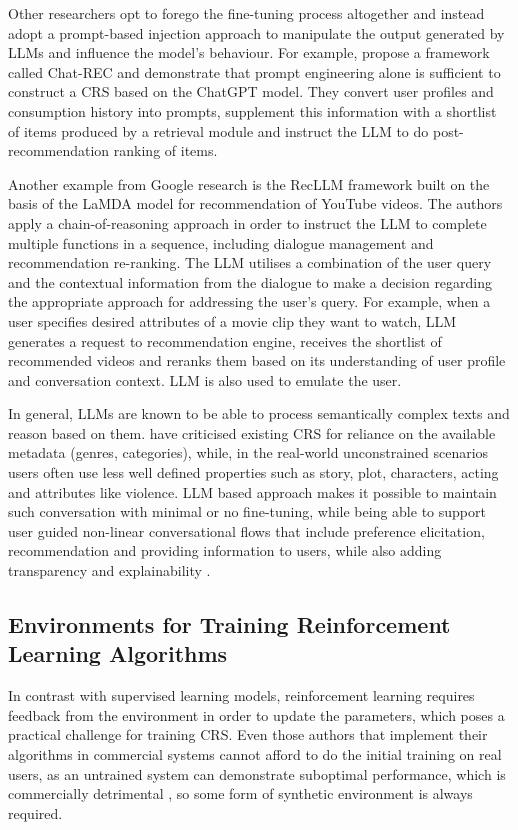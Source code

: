 Other researchers opt to forego the fine-tuning process altogether and instead adopt a prompt-based injection approach to manipulate the output generated by LLMs and influence the model's behaviour. For example, \citep{gao2023chat} propose a framework called Chat-REC and demonstrate that prompt engineering alone is sufficient to construct a CRS based on the ChatGPT model. They convert user profiles and consumption history into prompts, supplement this information with a shortlist of items produced by a retrieval module and instruct the LLM to do post-recommendation ranking of items. 

Another example from Google research is the RecLLM framework built on the basis of the LaMDA model \citep{friedman2023leveraging} for recommendation of YouTube videos.  The authors apply a chain-of-reasoning approach in order to instruct the LLM to complete multiple functions in a sequence, including dialogue management and recommendation re-ranking. The LLM utilises a combination of the user query and the contextual information from the dialogue to make a decision regarding the appropriate approach for addressing the user's query. For example, when a user specifies desired attributes of a movie clip they want to watch, LLM generates a request to recommendation engine, receives the shortlist of recommended videos and reranks them based on its understanding of user profile and conversation context. LLM is also used to emulate the user.

In general, LLMs are known to be able to process semantically complex texts and reason based on them. \cite{radlinski2019coached} have criticised existing CRS for reliance on the available metadata (genres, categories), while, in the real-world unconstrained scenarios users often use less well defined properties such as story, plot, characters, acting and attributes like violence. LLM based approach makes it possible to maintain such conversation with minimal or no fine-tuning, while being able to support user guided non-linear conversational flows that include preference elicitation, recommendation and providing information to users, while also adding transparency and explainability \citep{gao2023chat, bao2023tallrec}.

\subsection{Environments for Training Reinforcement Learning Algorithms}
In contrast with supervised learning models, reinforcement learning requires feedback from the environment in order to update the parameters, which poses a practical challenge for training CRS. Even those authors that implement their algorithms in commercial systems cannot afford to do the initial training on real users, as an untrained system can demonstrate suboptimal performance, which is commercially detrimental \citep{mahmood2009improving, mahmood2009learning}, so some form of synthetic environment is always required.

